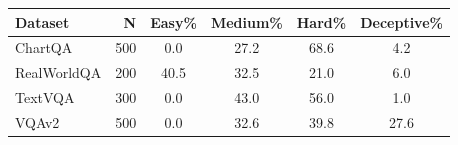 \begin{tabular}{lrcccc}
\toprule
Dataset & N & Easy\% & Medium\% & Hard\% & Deceptive\% \\
\midrule
ChartQA & 500 & 0.0 & 27.2 & 68.6 & 4.2 \\
RealWorldQA & 200 & 40.5 & 32.5 & 21.0 & 6.0 \\
TextVQA & 300 & 0.0 & 43.0 & 56.0 & 1.0 \\
VQAv2 & 500 & 0.0 & 32.6 & 39.8 & 27.6 \\
\bottomrule
\end{tabular}